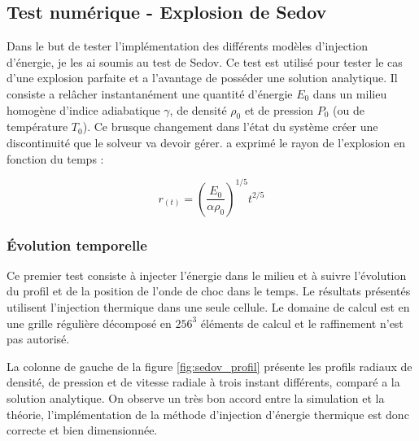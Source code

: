 \subsection{Test numérique - Explosion de Sedov}
\label{sec:sedov}


Dans le but de tester l'implémentation des différents modèles d'injection d'énergie, je les ai soumis au test de Sedov.
Ce test est utilisé pour tester le cas d'une explosion parfaite et a l'avantage de posséder une solution analytique.
Il consiste a relâcher instantanément une quantité d'énergie $E_0$ dans un milieu homogène d'indice adiabatique $\gamma$, de densité $\rho_0$ et de pression $P_0$ (ou de température $T_0$).
Ce brusque changement dans l'état du système créer une discontinuité que le solveur va devoir gérer.
\cite{sedov_similarity_1959} a exprimé le rayon de l'explosion en fonction du temps  : 

\begin{equation}
r_{(t)}=\left( \frac{E_0}{\alpha \rho_0 }\right)^{1/5} t^{2/5}
\end{equation}


\subsubsection{Évolution temporelle }


Ce premier test consiste à injecter l'énergie dans le milieu et à suivre l'évolution du profil et de la position de l'onde de choc dans le temps.
Le résultats présentés utilisent l'injection thermique dans une seule cellule.
Le domaine de calcul est en une grille régulière décomposé en $256^3$ éléments  de calcul et le raffinement n'est pas autorisé.

La colonne de gauche de la figure \ref{fig:sedov_profil} présente les profils radiaux de densité, de pression et de vitesse radiale à trois instant différents, comparé a la solution analytique.
On observe un très bon accord entre la simulation et la théorie, l'implémentation de la méthode d'injection d'énergie thermique est donc correcte et bien dimensionnée.

